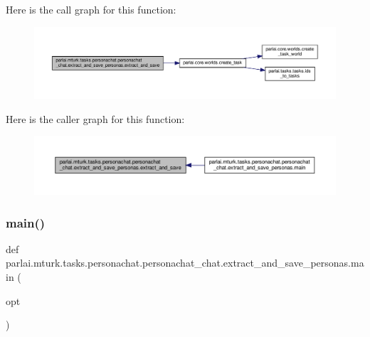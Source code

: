 Here is the call graph for this function\+:
\nopagebreak
\begin{figure}[H]
\begin{center}
\leavevmode
\includegraphics[width=350pt]{namespaceparlai_1_1mturk_1_1tasks_1_1personachat_1_1personachat__chat_1_1extract__and__save__personas_ad456be8590e65dece8a4b1e57aacef65_cgraph}
\end{center}
\end{figure}
Here is the caller graph for this function\+:
\nopagebreak
\begin{figure}[H]
\begin{center}
\leavevmode
\includegraphics[width=350pt]{namespaceparlai_1_1mturk_1_1tasks_1_1personachat_1_1personachat__chat_1_1extract__and__save__personas_ad456be8590e65dece8a4b1e57aacef65_icgraph}
\end{center}
\end{figure}
\mbox{\label{namespaceparlai_1_1mturk_1_1tasks_1_1personachat_1_1personachat__chat_1_1extract__and__save__personas_a3fadfe6571f33f89367defbb1d3907e0}} 
\subsubsection{\texorpdfstring{main()}{main()}}
{\footnotesize\ttfamily def parlai.\+mturk.\+tasks.\+personachat.\+personachat\+\_\+chat.\+extract\+\_\+and\+\_\+save\+\_\+personas.\+main (\begin{DoxyParamCaption}\item[{}]{opt }\end{DoxyParamCaption})}



